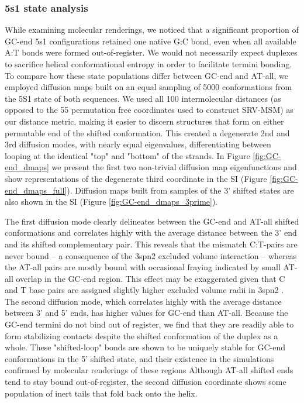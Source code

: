 \documentclass[journal=jpcbfk,manuscript=article]{achemso}
\begin{document}
\subsubsection{5s1 state analysis}
While examining molecular renderings, we noticed that a significant proportion of GC-end 5s1 configurations retained one native G:C bond, even when all available A:T bonds were formed out-of-register. We would not necessarily expect duplexes to sacrifice helical conformational entropy in order to facilitate termini bonding. To compare how these state populations differ between GC-end and AT-all, we employed diffusion maps built on an equal sampling of 5000 conformations from the 5S1 state of both sequences. We used all 100 intermolecular distances (as opposed to the 55 permutation free coordinates used to construct SRV-MSM) as our distance metric, making it easier to discern structures that form on either permutable end of the shifted conformation. This created a degenerate 2nd and 3rd diffusion modes, with nearly equal eigenvalues, differentiating between looping at the identical "top" and "bottom" of the strands. In Figure \ref{fig:GC-end_dmaps} we present the first two non-trivial diffusion map eigenfunctions and show representations of the degenerate third coordinate in the SI (Figure \ref{fig:GC-end_dmaps_full}). Diffusion maps built from samples of the 3' shifted states are also shown in the SI (Figure \ref{fig:GC-end_dmaps_3prime}). 

The first diffusion mode clearly delineates between the GC-end and AT-all shifted conformations and correlates highly with the average distance between the 3' end and its shifted complementary pair. This reveals that the mismatch C:T-pairs are never bound -- a consequence of the 3spn2 excluded volume interaction -- whereas the AT-all pairs are mostly bound with occasional fraying indicated by small AT-all overlap in the GC-end region. This effect may be exaggerated given that C and T base pairs are assigned slightly higher excluded volume radii in 3spn2 \citep{Hinckley2013AnHybridization}. The second diffusion mode, which correlates highly with the average distance between 3' and 5' ends, has higher values for GC-end than AT-all. Because the GC-end termini do not bind out of register, we find that they are readily able to form stabilizing contacts despite the shifted conformation of the duplex as a whole. These "shifted-loop" bonds are shown to be uniquely stable for GC-end conformations in the 5' shifted state, and their existence in the simulations confirmed by molecular renderings of these regions Although AT-all shifted ends tend to stay bound out-of-register, the second diffusion coordinate shows some population of inert tails that fold back onto the helix.
\end{document}
